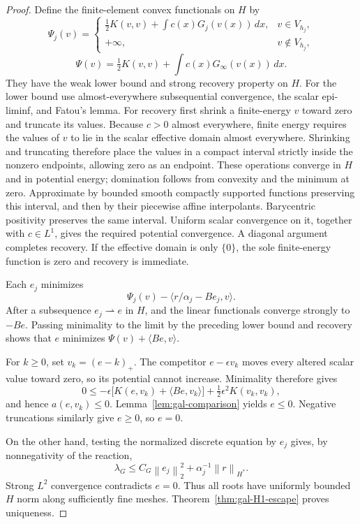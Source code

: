 \documentclass[11pt,a4paper]{article}
\newcommand{\norm}[1]{\left\lVert#1\right\rVert}
\theoremstyle{definition}
\theoremstyle{remark}
\numberwithin{equation}{section}
\begin{document}
\begin{proof}
Define the finite-element convex functionals on $H$ by
\[
 \Psi_j(v)=\begin{cases}
 \displaystyle\tfrac12K(v,v)+\int c(x)G_j(v(x))\,dx,&v\in V_{h_j},\\
 +\infty,&v\notin V_{h_j},
 \end{cases}
\]
\[
 \Psi(v)=\tfrac12K(v,v)+\int c(x)G_\infty(v(x))\,dx.
\]
They have the weak lower bound and strong recovery property on $H$. For the lower bound use almost-everywhere subsequential convergence, the scalar epi-liminf, and Fatou's lemma. For recovery first shrink a finite-energy $v$ toward zero and truncate its values. Because $c>0$ almost everywhere, finite energy requires the values of $v$ to lie in the scalar effective domain almost everywhere. Shrinking and truncating therefore place the values in a compact interval strictly inside the nonzero endpoints, allowing zero as an endpoint. These operations converge in $H$ and in potential energy; domination follows from convexity and the minimum at zero. Approximate by bounded smooth compactly supported functions preserving this interval, and then by their piecewise affine interpolants. Barycentric positivity preserves the same interval. Uniform scalar convergence on it, together with $c\in L^1$, gives the required potential convergence. A diagonal argument completes recovery. If the effective domain is only $\{0\}$, the sole finite-energy function is zero and recovery is immediate.

Each $e_j$ minimizes
\[
 \Psi_j(v)-\langle r/\alpha_j-Be_j,v\rangle.
\]
After a subsequence $e_j\rightharpoonup e$ in $H$, and the linear functionals converge strongly to $-Be$. Passing minimality to the limit by the preceding lower bound and recovery shows that $e$ minimizes $\Psi(v)+\langle Be,v\rangle$.

For $k\ge0$, set $v_k=(e-k)_+$. The competitor $e-\epsilon v_k$ moves every altered scalar value toward zero, so its potential cannot increase. Minimality therefore gives
\[
 0\le-\epsilon\bigl[K(e,v_k)+\langle Be,v_k\rangle\bigr]
             +\tfrac12\epsilon^2K(v_k,v_k),
\]
and hence $a(e,v_k)\le0$. Lemma~\ref{lem:gal-comparison} yields $e\le0$. Negative truncations similarly give $e\ge0$, so $e=0$.

On the other hand, testing the normalized discrete equation by $e_j$ gives, by nonnegativity of the reaction,
\[
 \lambda_G\le C_G\norm{e_j}_2^2+\alpha_j^{-1}\norm{r}_{H^*}.
\]
Strong $L^2$ convergence contradicts $e=0$. Thus all roots have uniformly bounded $H$ norm along sufficiently fine meshes. Theorem~\ref{thm:gal-H1-escape} proves uniqueness.
\end{proof}
\end{document}
